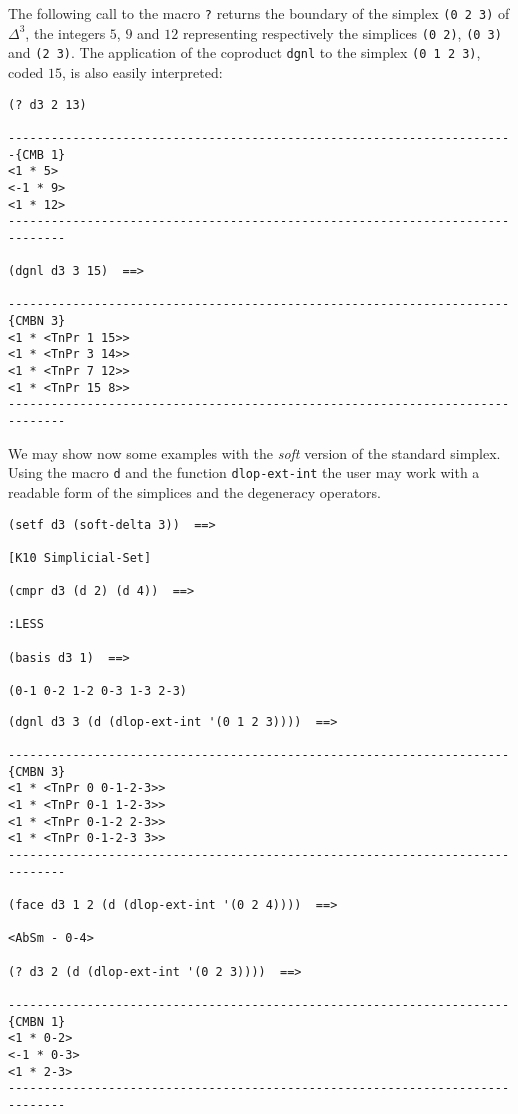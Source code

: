The following  call to the macro {\tt ?} returns the boundary of the simplex {\tt (0 2 3)}
of $\Delta^3$, the integers $5$, $9$ and $12$ representing respectively the simplices
{\tt (0 2)}, {\tt (0 3)} and {\tt (2 3)}. The application of the coproduct {\tt dgnl} to the
simplex {\tt (0 1 2 3)}, coded $15$, is also easily interpreted:
{\footnotesize\begin{verbatim}
(? d3 2 13)

-----------------------------------------------------------------------{CMB 1}
<1 * 5>
<-1 * 9>
<1 * 12>
------------------------------------------------------------------------------

(dgnl d3 3 15)  ==>

----------------------------------------------------------------------{CMBN 3}
<1 * <TnPr 1 15>>
<1 * <TnPr 3 14>>
<1 * <TnPr 7 12>>
<1 * <TnPr 15 8>>
------------------------------------------------------------------------------
\end{verbatim}}
We may show now some examples with the {\it soft} version of the standard
simplex. Using the macro {\tt d} and the function {\tt dlop-ext-int} the user may work
with a readable form of the simplices and the degeneracy operators.
{\footnotesize\begin{verbatim}
(setf d3 (soft-delta 3))  ==>

[K10 Simplicial-Set]

(cmpr d3 (d 2) (d 4))  ==>

:LESS

(basis d3 1)  ==>

(0-1 0-2 1-2 0-3 1-3 2-3)
\end{verbatim}}
\newpage
{\footnotesize\begin{verbatim}
(dgnl d3 3 (d (dlop-ext-int '(0 1 2 3))))  ==>

----------------------------------------------------------------------{CMBN 3}
<1 * <TnPr 0 0-1-2-3>>
<1 * <TnPr 0-1 1-2-3>>
<1 * <TnPr 0-1-2 2-3>>
<1 * <TnPr 0-1-2-3 3>>
------------------------------------------------------------------------------

(face d3 1 2 (d (dlop-ext-int '(0 2 4))))  ==>

<AbSm - 0-4>

(? d3 2 (d (dlop-ext-int '(0 2 3))))  ==>

----------------------------------------------------------------------{CMBN 1}
<1 * 0-2>
<-1 * 0-3>
<1 * 2-3>
------------------------------------------------------------------------------
\end{verbatim}}
\newpage

